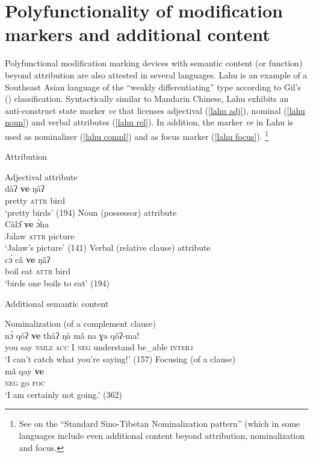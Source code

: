 \section[Polyfunctionality and additional content]{Polyfunctionality of modification markers and additional content}
Polyfunctional modification marking devices with semantic content (or function) beyond attribution are also attested in several languages. Lahu is an example of a Southeast Asian language of the “weakly differentiating” type according to Gil's (\citeyear{gil2005}) classification. Syntactically similar to Mandarin Chinese, Lahu exhibits an anti-construct state marker \textit{ve} that licenses adjectival (\ref{lahu adj}), nominal (\ref{lahu noun}) and verbal attributes (\ref{lahu rel}). In addition, the marker \textit{ve} in Lahu is used as nominalizer (\ref{lahu compl}) and as focus marker (\ref{lahu focus}).
\footnote{See \citealt{bickel1999} on the “Standard Sino-Tibetan Nominalization pattern” (which in some languages include even additional content beyond attribution, nominalization and focus.}
\begin{exe}
\ex
{}
\begin{xlist}
\ex	\rm{Attribution}
\begin{xlist}
\ex	\rm{Adjectival attribute}\\
\gll	dàʔ	\textbf{ve}	ŋâʔ\\
	pretty	\textsc{attr}	bird\\
\glt	‘pretty birds’ (194)\label{lahu adj}
\ex	\rm{Noun (possessor) attribute}\\
\gll	Càl\^{ɔ}	\textbf{ve}	\`{ɔ}ha\\
	Jalaw	\textsc{attr}	picture\\
\glt	‘Jalaw's picture’ (141)\label{lahu noun}
\ex	\rm{Verbal (relative clause) attribute}\\
\gll	c\'{ɔ}	câ	\textbf{ve}	ŋâʔ\\
	boil	eat	\textsc{attr}	bird\\
\glt	‘birds one boils to eat’ (194)\label{lahu rel}
\end{xlist}
\ex	\rm{Additional semantic content}
\begin{xlist}
\ex \rm{Nominalization (of a complement clause)}\\
\gll	n\`{ɔ}	qôʔ \textbf{ve}	thàʔ	ŋà mâ	na ɣa	qôʔ-ma!\\
	you	say \textsc{nmlz}	\textsc{acc} I	\textsc{neg} understand	be\_able	\textsc{interj}\\
\glt	‘I can't catch what you're saying!’ (157)\label{lahu compl}
\ex	\rm{Focusing (of a clause)}\\
\gll	mâ		qay	\textbf{ve}\\
	\textsc{neg}	go	\textsc{foc}\\
\glt	‘I am certainly not going.’ (362)\label{lahu focus}
\end{xlist}
\end{xlist}
\end{exe}

